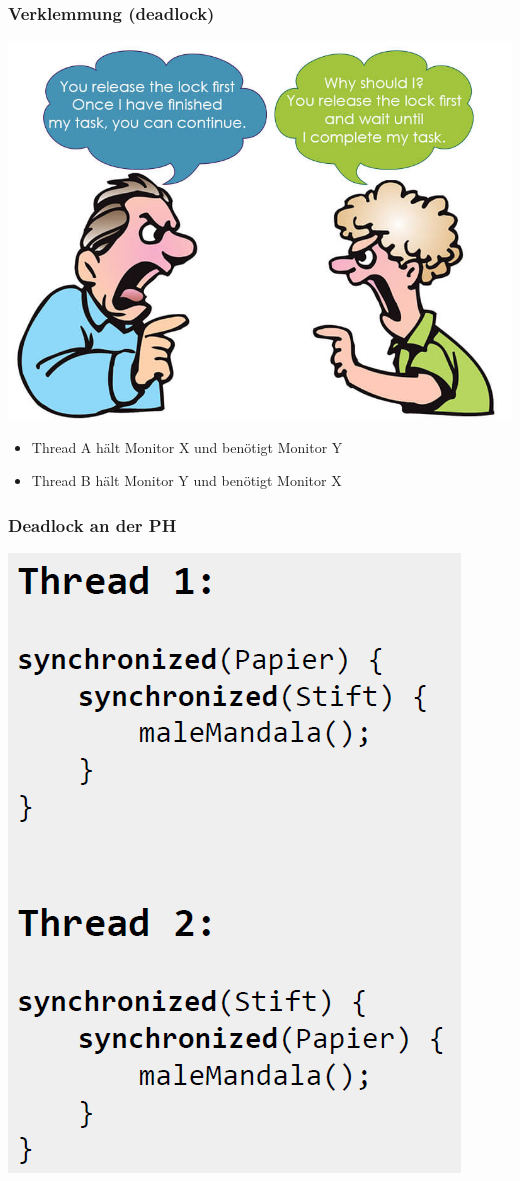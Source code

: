 \documentclass[18pt]{beamer}
\begin{document}
	\begin{frame}
		\frametitle{Verklemmung (deadlock)}
		\includegraphics[scale=0.3]{./pics/tut5/deadlock.jpg}
		\pause
		\begin{itemize}
			\item Thread A hält Monitor X und benötigt Monitor Y
			\item Thread B hält Monitor Y und benötigt Monitor X
		\end{itemize}
	\end{frame}

	\begin{frame}
		\frametitle{Deadlock an der PH}
			\centering \includegraphics[scale=0.4]{./pics/tut5/deadlock-ex.png}
	\end{frame}
\end{document}
